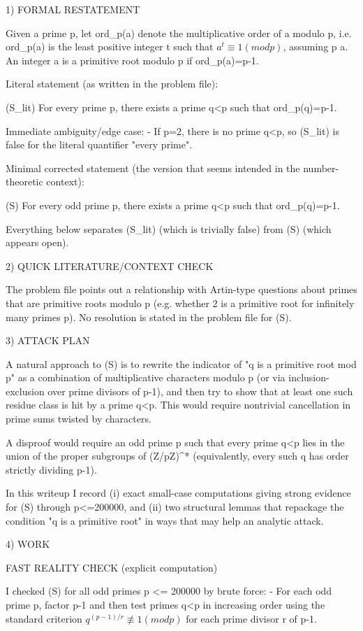 
1) FORMAL RESTATEMENT

Given a prime p, let ord_p(a) denote the multiplicative order of a modulo p, i.e.
ord_p(a) is the least positive integer t such that \(a^t \equiv 1 (mod p)\), assuming p \nmid a.
An integer a is a primitive root modulo p if ord_p(a)=p-1.

Literal statement (as written in the problem file):

  (S_lit)  For every prime p, there exists a prime q<p such that ord_p(q)=p-1.

Immediate ambiguity/edge case:
- If p=2, there is no prime q<p, so (S_lit) is false for the literal quantifier "every prime".

Minimal corrected statement (the version that seems intended in the number-theoretic context):

  (S)  For every odd prime p, there exists a prime q<p such that ord_p(q)=p-1.

Everything below separates (S_lit) (which is trivially false) from (S) (which appears open).

2) QUICK LITERATURE/CONTEXT CHECK

The problem file points out a relationship with Artin-type questions about primes that are
primitive roots modulo p (e.g. whether 2 is a primitive root for infinitely many primes p).
No resolution is stated in the problem file for (S).

3) ATTACK PLAN

A natural approach to (S) is to rewrite the indicator of "q is a primitive root mod p" as a
combination of multiplicative characters modulo p (or via inclusion-exclusion over prime
divisors of p-1), and then try to show that at least one such residue class is hit by a prime
q<p. This would require nontrivial cancellation in prime sums twisted by characters.

A disproof would require an odd prime p such that every prime q<p lies in the union of the
proper subgroups of (Z/pZ)^* (equivalently, every such q has order strictly dividing p-1).

In this writeup I record (i) exact small-case computations giving strong evidence for (S)
through p<=200000, and (ii) two structural lemmas that repackage the condition "q is a
primitive root" in ways that may help an analytic attack.

4) WORK

FAST REALITY CHECK (explicit computation)

I checked (S) for all odd primes p <= 200000 by brute force:
- For each odd prime p, factor p-1 and then test primes q<p in increasing order using the
  standard criterion \(q^{(p-1)/r} \not\equiv 1 (mod p)\) for each prime divisor r of p-1.

